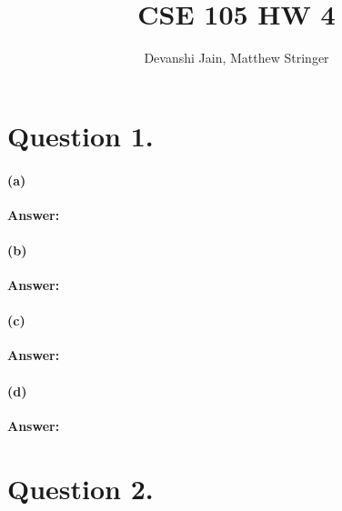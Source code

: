 \documentclass{article}
\title{CSE 105 HW 4}
\author{
    Devanshi Jain, Matthew Stringer 
}
\theoremstyle{definition}
\renewcommand{\ques}[1]{\section*{Question #1.}}
\begin{document}
    \maketitle
    \ques{1}
    \paragraph{(a)}
        \textbf{Answer: } 
    \paragraph*{(b)}
        \textbf{Answer: }  
    \paragraph*{(c)}
        \textbf{Answer: } 
    \paragraph*{(d)}
        \textbf{Answer: }
    
    \ques{2}
\end{document}
